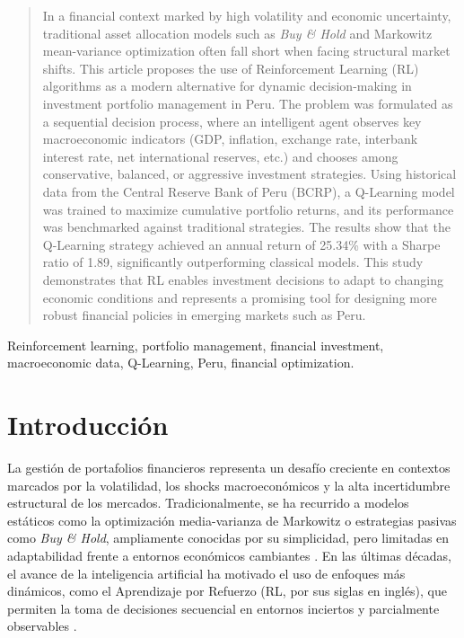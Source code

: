 \documentclass[conference]{IEEEtran}
\begin{document}
	\begin{abstract}
		In a financial context marked by high volatility and economic uncertainty, traditional asset allocation models such as \textit{Buy \& Hold} and Markowitz mean-variance optimization often fall short when facing structural market shifts. This article proposes the use of Reinforcement Learning (RL) algorithms as a modern alternative for dynamic decision-making in investment portfolio management in Peru. The problem was formulated as a sequential decision process, where an intelligent agent observes key macroeconomic indicators (GDP, inflation, exchange rate, interbank interest rate, net international reserves, etc.) and chooses among conservative, balanced, or aggressive investment strategies. Using historical data from the Central Reserve Bank of Peru (BCRP), a Q-Learning model was trained to maximize cumulative portfolio returns, and its performance was benchmarked against traditional strategies. The results show that the Q-Learning strategy achieved an annual return of 25.34\% with a Sharpe ratio of 1.89, significantly outperforming classical models. This study demonstrates that RL enables investment decisions to adapt to changing economic conditions and represents a promising tool for designing more robust financial policies in emerging markets such as Peru.
	\end{abstract}
	
	\begin{IEEEkeywords}
		Reinforcement learning, portfolio management, financial investment, macroeconomic data, Q-Learning, Peru, financial optimization.
	\end{IEEEkeywords}
	
	\section{Introducción}
	
	La gestión de portafolios financieros representa un desafío creciente en contextos marcados por la volatilidad, los shocks macroeconómicos y la alta incertidumbre estructural de los mercados. Tradicionalmente, se ha recurrido a modelos estáticos como la optimización media-varianza de Markowitz \cite{markowitz1952portfolio} o estrategias pasivas como \textit{Buy \& Hold}, ampliamente conocidas por su simplicidad, pero limitadas en adaptabilidad frente a entornos económicos cambiantes \cite{fabozzi2007robust}. En las últimas décadas, el avance de la inteligencia artificial ha motivado el uso de enfoques más dinámicos, como el Aprendizaje por Refuerzo (RL, por sus siglas en inglés), que permiten la toma de decisiones secuencial en entornos inciertos y parcialmente observables \cite{li2017deep}.
	
\end{document}
